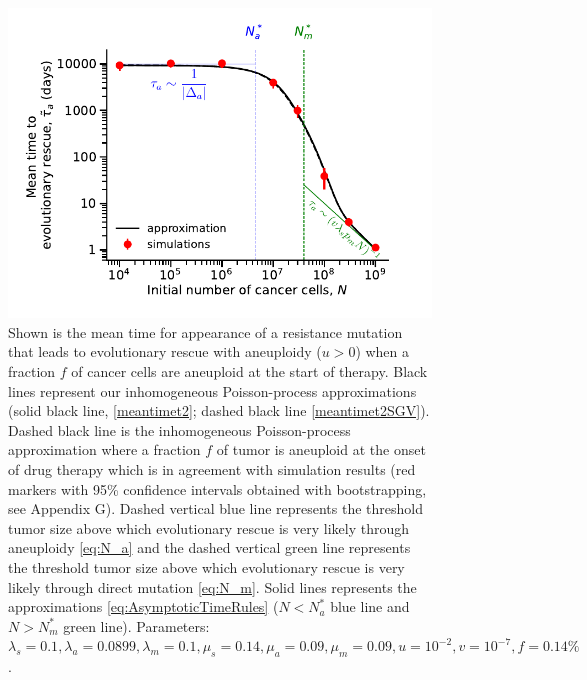 \documentclass[12pt]{extarticle}
\begin{document}
\begin{appendices}
\begin{figure}
\includegraphics[width=1\textwidth]{Figures/SGVEvolutionaryRescueTimeComplete.pdf} %
\caption{Shown is the mean time for appearance of a resistance mutation that leads to evolutionary rescue with aneuploidy ($u>0$) when a fraction $f$ of cancer cells are aneuploid at the start of therapy. Black lines represent our inhomogeneous Poisson-process approximations (solid black line, \cref{meantimet2}; dashed black line \cref{meantimet2SGV}). Dashed black line is the  inhomogeneous Poisson-process approximation where a fraction $f$ of tumor is aneuploid at the onset of drug therapy which is in agreement with simulation results (red markers with 95\% confidence intervals obtained with bootstrapping, see Appendix G). Dashed vertical blue line represents the threshold tumor size above which evolutionary rescue is very likely through aneuploidy \cref{eq:N_a} and the dashed vertical green line represents the threshold tumor size above which evolutionary rescue is very likely through direct mutation \cref{eq:N_m}. Solid lines represents the approximations \cref{eq:AsymptoticTimeRules} ($N<N_a^*$ blue line and $N>N_m^*$ green line). 
Parameters: $\lambda_s=0.1,\lambda_a=0.0899,\lambda_m=0.1,\mu_s=0.14,\mu_a=0.09,\mu_m=0.09, u=10^{-2}, v=10^{-7},f=0.14\%$.} %
\label{SGVEvolutionaryRescueTimeComplete}
\end{figure}
\begin{figure}

\end{figure}
\end{appendices}
\end{document}
